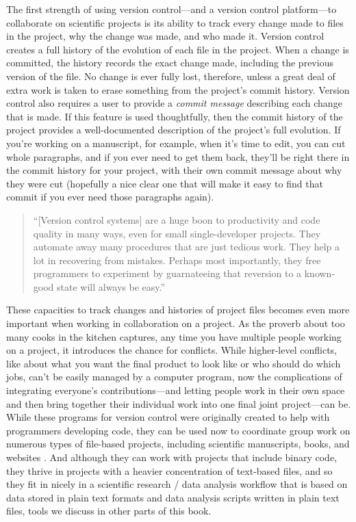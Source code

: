 \documentclass[]{tufte-book}
\begin{document}
The first strength of using version control---and a version control
platform---to collaborate on scientific projects is its ability to track every
change made to files in the project, why the change was made, and who made it.
Version control creates a full history of the evolution of each file in the
project. When a change is committed, the history records the exact change made,
including the previous version of the file. No change is ever fully lost,
therefore, unless a great deal of extra work is taken to erase something from
the project's commit history. Version control also requires a user to provide a
\emph{commit message} describing each change that is made. If this feature is used
thoughtfully, then the commit history of the project provides a well-documented
description of the project's full evolution. If you're working on a manuscript,
for example, when it's time to edit, you can cut whole paragraphs, and if you
ever need to get them back, they'll be right there in the commit history for
your project, with their own commit message about why they were cut (hopefully a
nice clear one that will make it easy to find that commit if you ever need those
paragraphs again).

\begin{quote}
``{[}Version control systems{]} are a huge boon to productivity and code quality in
many ways, even for small single-developer projects. They automate away many
procedures that are just tedious work. They help a lot in recovering from
mistakes. Perhaps most importantly, they free programmers to experiment by
guarnateeing that reversion to a known-good state will always be easy.''
\citep{raymond2003art}
\end{quote}

These capacities to track changes and histories of project files becomes even
more important when working in collaboration on a project. As the proverb about
too many cooks in the kitchen captures, any time you have multiple people
working on a project, it introduces the chance for conflicts. While higher-level
conflicts, like about what you want the final product to look like or who should
do which jobs, can't be easily managed by a computer program, now the
complications of integrating everyone's contributions---and letting people work
in their own space and then bring together their individual work into one final
joint project---can be. While these programs for version control were originally
created to help with programmers developing code, they can be used now to
coordinate group work on numerous types of file-based projects, including
scientific manuscripts, books, and websites \citep{raymondunderstanding}. And
although they can work with projects that include binary code, they thrive in
projects with a heavier concentration of text-based files, and so they fit in
nicely in a scientific research / data analysis workflow that is based on data
stored in plain text formats and data analysis scripts written in plain text
files, tools we discuss in other parts of this book.
\end{document}
